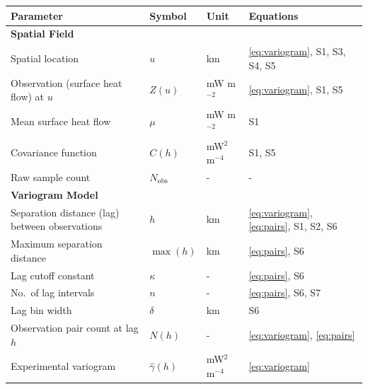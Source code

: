 \documentclass[draft,linenumbers]{agujournal2019}
\newcounter{none}
\begin{document}
{\def\LTcaptype{none} %
\begin{longtable}[]{@{}
  >{\raggedright\arraybackslash}p{}
  >{\raggedright\arraybackslash}p{}
  >{\raggedright\arraybackslash}p{}
  >{\raggedright\arraybackslash}p{}@{}}
\toprule\noalign{}
\begin{minipage}[b]{\linewidth}\raggedright
Parameter
\end{minipage} & \begin{minipage}[b]{\linewidth}\raggedright
Symbol
\end{minipage} & \begin{minipage}[b]{\linewidth}\raggedright
Unit
\end{minipage} & \begin{minipage}[b]{\linewidth}\raggedright
Equations
\end{minipage} \\
\midrule\noalign{}
\endhead
\bottomrule\noalign{}
\endlastfoot
\textbf{Spatial Field} & & & \\
Spatial location & \(u\) & km & \ref{eq:variogram}, S1, S3, S4, S5 \\
Observation (surface heat flow) at \(u\) & \(Z(u)\) & mW m\(^{-2}\) &
\ref{eq:variogram}, S1, S5 \\
Mean surface heat flow & \(\mu\) & mW m\(^{-2}\) & S1 \\
Covariance function & \(C(h)\) & mW\(^2\) m\(^{-4}\) & S1, S5 \\
Raw sample count & \(N_\mathrm{obs}\) & - & - \\
\textbf{Variogram Model} & & & \\
Separation distance (lag) between observations & \(h\) & km &
\ref{eq:variogram}, \ref{eq:pairs}, S1, S2, S6 \\
Maximum separation distance & \(\max(h)\) & km & \ref{eq:pairs}, S6 \\
Lag cutoff constant & \(\kappa\) & - & \ref{eq:pairs}, S6 \\
No.~of lag intervals & \(n\) & - & \ref{eq:pairs}, S6, S7 \\
Lag bin width & \(\delta\) & km & S6 \\
Observation pair count at lag \(h\) & \(N(h)\) & - &
\ref{eq:variogram}, \ref{eq:pairs} \\
Experimental variogram & \(\hat{\gamma}(h)\) & mW\(^2\) m\(^{-4}\) &
\ref{eq:variogram} \\

\end{longtable}}
\end{document}
